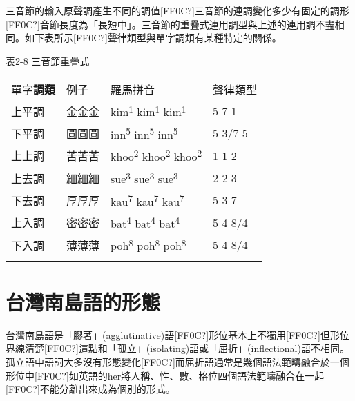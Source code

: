 \textrm{三音節的輸入原聲調產生不同的調值[FF0C?]三音節的連調變化多少有固定的調形[FF0C?]音節長度為「長短中」。三音節的重疊式連用調型與上述的連用調不盡相同。如下表所示[FF0C?]聲律類型與單字調類有某種特定的關係。}

\rmfamily
表2-8 三音節重疊式

\tablefirsthead{}

\tabletail{}
\tablelasttail{}
\begin{tabularx}{\textwidth}{XXXX}
\lsptoprule

{\sffamily \textrm{單字}\textrm{\textbf{調類}}} & 例子 & 羅馬拼音 & 聲律類型\\
 上平調 & 金金金 & {\sffamily \textrm{kim}\textrm{\textsuperscript{1} }\textrm{kim}\textrm{\textsuperscript{1}} \textrm{kim}\textrm{\textsuperscript{1}}} & 5 7 1\\
 下平調 & 圓圓圓 & {\sffamily \textrm{inn}\textrm{\textsuperscript{5}} \textrm{inn}\textrm{\textsuperscript{5}} \textrm{inn}\textrm{\textsuperscript{5}}} & 5 3/7 5\\
 上上調 & 苦苦苦 & {\sffamily \textrm{khoo}\textrm{\textsuperscript{2}} \textrm{khoo}\textrm{\textsuperscript{2}} \textrm{khoo}\textrm{\textsuperscript{2}}} & 1 1 2\\
 上去調 & 細細細 & {\sffamily \textrm{sue}\textrm{\textsuperscript{3}} \textrm{sue}\textrm{\textsuperscript{3}} \textrm{sue}\textrm{\textsuperscript{3}}} & 2 2 3\\
 下去調 & 厚厚厚 & {\sffamily \textrm{kau}\textrm{\textsuperscript{7}} \textrm{kau}\textrm{\textsuperscript{7}} \textrm{kau}\textrm{\textsuperscript{7}}} & 5 3 7\\
 上入調 & 密密密 & {\sffamily \textrm{bat}\textrm{\textsuperscript{4}} \textrm{bat}\textrm{\textsuperscript{4}} \textrm{bat}\textrm{\textsuperscript{4}}} & 5 4 8/4\\
 下入調 & 薄薄薄 & {\sffamily \textrm{poh}\textrm{\textsuperscript{8}} \textrm{poh}\textrm{\textsuperscript{8}} \textrm{poh}\textrm{\textsuperscript{8}}} & 5 4 8/4\\
\lspbottomrule
\end{tabularx}
\section{\textrm{台灣南島語的形態}}
\begin{styleii}
台灣南島語是「膠著」(agglutinative)語\textsf{[FF0C?]}形位基本上不獨用\textsf{[FF0C?]}但形位界線清楚\textsf{[FF0C?]}這點和「孤立」(isolating)語或「屈折」(inflectional)語不相同\textsf{。}孤立語中語詞大多沒有形態變化\textsf{[FF0C?]}而屈折語通常是幾個語法範疇融合於一個形位中\textsf{[FF0C?]}如英語的her將人稱\textsf{、}性\textsf{、}數\textsf{、}格位四個語法範疇融合在一起\textsf{[FF0C?]}不能分離出來成為個別的形式\textsf{。}
\end{styleii}

